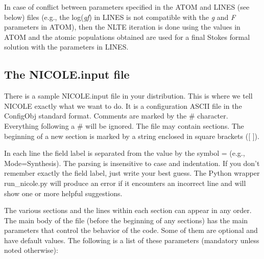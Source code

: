 In case of conflict between parameters specified in the ATOM and LINES
(see below) files (e.g., the log({\em gf}) in LINES is not compatible
with the {\em g} and {\em F} parameters in ATOM), then the NLTE
iteration is done using the values in ATOM and the atomic populations
obtained are used for a final Stokes formal solution with the
parameters in LINES.

\subsection{The NICOLE.input file}
\label{nicinput}

There is a sample NICOLE.input file in your distribution.  This is
where we tell NICOLE exactly what we want to do. It is a
configuration ASCII file in the ConfigObj standard format. Comments
are marked by the \# character. Everything following a \# will be
ignored. The file may contain sections. The beginning of a new section
is marked by a string enclosed in square brackets ([ ]).

In each line the field label is separated from the value by the symbol
= (e.g., Mode=Synthesis). The parsing is insensitive to case and
indentation. If you don't remember exactly the field label, just write
your best guess. The Python wrapper run\_nicole.py will produce an
error if it encounters an incorrect line and will show one or more
helpful suggestions.

The various sections and the lines within each section
can appear in any order.  The main body of the file (before the
beginning of any sections) has the main parameters that control the
behavior of the code. Some of them are optional and have default
values. The following is a list of these parameters (mandatory unless
noted otherwise):

